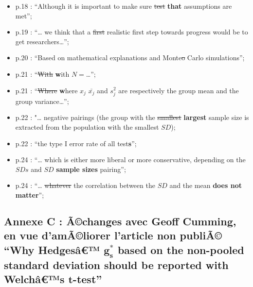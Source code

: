 \begin{appendix}
\begin{itemize}
\tightlist
\item
  p.18 : ``Although it is important to make sure \sout{test}
  \textbf{that} assumptions are met'';\\
\item
  p.19 : ``\ldots{} we think that a \sout{first} realistic first step
  towards progress would be to get researchers\ldots{}'';\\
\item
  p.20 : ``Based on mathematical explanations and Monte\sout{o} Carlo
  simulations'';\\
\item
  p.21 : ``\sout{With} \textbf{w}ith \(N=\)\ldots{}'';\\
\item
  p.21 : ``\sout{Where} \textbf{w}here \sout{\(x_j\)} \(\bar{x_j}\) and
  \(s^2_j\) are respectively the group mean and the group
  variance\ldots{}'';\\
\item
  p.22 : "\ldots{} negative pairings (the group with the \sout{smallest}
  \textbf{largest} sample size is extracted from the population with the
  smallest \(SD\));\\
\item
  p.22 : ``the type I error rate of all test\textbf{s}'';\\
\item
  p.24 : ``\ldots{} which is either more liberal or more conservative,
  depending on the \(SDs\) and \sout{\(SD\)} \textbf{sample sizes}
  pairing'';\\
\item
  p.24 : ``\ldots{} \sout{whatever} the correlation between the \(SD\)
  and the mean \textbf{does not matter}'';
\end{itemize}

\newpage

\hypertarget{annexe-c-uxe3changes-avec-geoff-cumming-en-vue-damuxe3liorer-larticle-non-publiuxe3-why-hedgesuxe2-bmg_s-based-on-the-non-pooled-standard-deviation-should-be-reported-with-welchuxe2s-bmt-test}{%
\subsection{\texorpdfstring{Annexe C : Ã©changes avec Geoff Cumming, en
vue d'amÃ©liorer l'article non publiÃ© ``Why Hedgesâ€™ \(\bm{g_s^*}\)
based on the non-pooled standard deviation should be reported with
Welchâ€™s
\(\bm{t}\)-test''}{Annexe C : Ã©changes avec Geoff Cumming, en vue d'amÃ©liorer l'article non publiÃ© ``Why Hedgesâ€™ \textbackslash bm\{g\_s\^{}*\} based on the non-pooled standard deviation should be reported with Welchâ€™s \textbackslash bm\{t\}-test''}}\label{annexe-c-uxe3changes-avec-geoff-cumming-en-vue-damuxe3liorer-larticle-non-publiuxe3-why-hedgesuxe2-bmg_s-based-on-the-non-pooled-standard-deviation-should-be-reported-with-welchuxe2s-bmt-test}}


\end{appendix}
